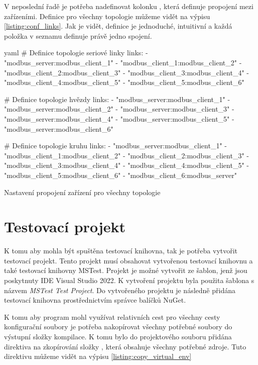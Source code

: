 V neposlední řadě je potřeba nadefinovat kolonku , která definuje propojení mezi zařízeními. Definice pro všechny topologie můžeme vidět na výpisu \ref{listing:conf_links}. Jak je vidět, definice je jednoduché, intuitivní a každá položka v seznamu definuje právě jedno spojení.

\begin{listing}[htbp]
    \centering
    \begin{cminted}[breaklines,autogobble, fontsize=\footnotesize]{yaml}
# Definice topologie seriové linky
links:
- "modbus_server:modbus_client_1"    
- "modbus_client_1:modbus_client_2"    
- "modbus_client_2:modbus_client_3"    
- "modbus_client_3:modbus_client_4"    
- "modbus_client_4:modbus_client_5"    
- "modbus_client_5:modbus_client_6"

# Definice topologie hvězdy
links:
- "modbus_server:modbus_client_1"    
- "modbus_server:modbus_client_2"    
- "modbus_server:modbus_client_3"    
- "modbus_server:modbus_client_4"    
- "modbus_server:modbus_client_5"    
- "modbus_server:modbus_client_6"

# Definice topologie kruhu
links:
- "modbus_server:modbus_client_1"    
- "modbus_client_1:modbus_client_2"    
- "modbus_client_2:modbus_client_3"    
- "modbus_client_3:modbus_client_4"    
- "modbus_client_4:modbus_client_5"    
- "modbus_client_5:modbus_client_6"
- "modbus_client_6:modbus_server"
    \end{cminted}
\caption{Nastavení propojení zařízení pro všechny topologie}
\label{listing:conf_links}
\end{listing}

\section{Testovací projekt}

K tomu aby mohla být spuštěna testovací knihovna, tak je potřeba vytvořit testovací projekt. Tento projekt musí obsahovat vytvořenou testovací knihovnu a také testovací knihovny MSTest. Projekt je možné vytvořit ze šablon, jenž jsou poskytnuty IDE Visual Studio 2022\cite{vs2022}. K vytvoření projektu byla použita šablona s názvem \textit{MSTest Test Project}. Do vytvořeného projektu je následně přidána testovací knihovna prostřednictvím správce balíčků NuGet\cite{nuget}. 

K tomu aby program mohl využívat relativních cest pro všechny cesty konfigurační soubory je potřeba nakopírovat všechny potřebné soubory do výstupní složky kompilace. K tomu bylo do projektového souboru přidána direktiva na zkopírování složky , která obsahuje všechny potřebné zdroje. Tuto direktivu můžeme vidět na výpisu \ref{listing:copy_virtual_env}

